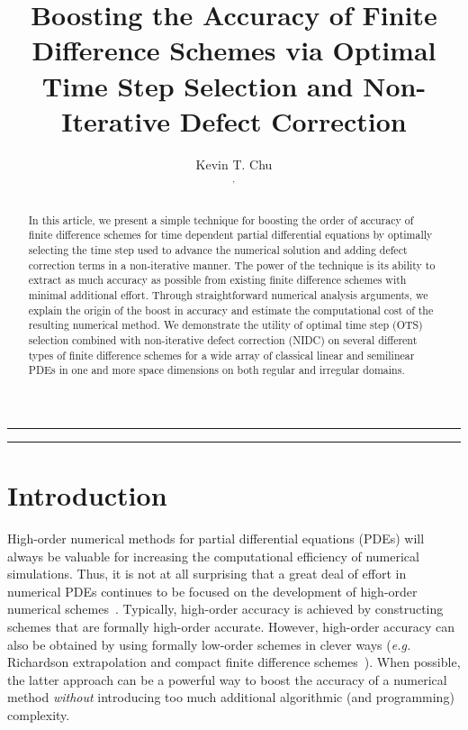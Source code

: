 \documentclass[fleqn,12pt,twoside]{article}
\def\eg{\emph{e.g. }}
\begin{document}


\title{Boosting the Accuracy of Finite Difference Schemes via
       Optimal Time Step Selection and Non-Iterative Defect Correction}

\author{Kevin T. Chu\address{Institute of High Performance Computing, A*STAR, Singapore, Singapore}$^,$\address{Vitamin D, Inc., Menlo Park, CA 94025, United States}
}


\maketitle

\noindent \rule{6.3in}{1pt}

\begin{abstract}
In this article, we present a simple technique for boosting the order of 
accuracy of finite difference schemes for time dependent 
partial differential equations by optimally selecting the time step used
to advance the numerical solution and adding defect correction terms in a
non-iterative manner.  The power of the technique is its ability to extract 
as much accuracy as possible from existing finite difference schemes with 
minimal additional effort.  Through straightforward numerical analysis 
arguments, we explain the origin of the boost in accuracy and estimate the 
computational cost of the resulting numerical method.  We demonstrate the 
utility of optimal time step (OTS) selection combined with non-iterative 
defect correction (NIDC) on several different types of finite difference
schemes for a wide array of classical linear and semilinear PDEs in one and 
more space dimensions on both regular and irregular domains.  
\end{abstract}

\noindent \rule{6.3in}{1pt}


\section{Introduction}
High-order numerical methods for partial differential equations (PDEs) will 
always be valuable for increasing the computational efficiency of numerical 
simulations.  Thus, it is not at all surprising that a great deal of effort in 
numerical PDEs continues to be focused on the development of high-order 
numerical 
schemes~\cite{spotz_2001,bruger_2005,gibou_2005,ito_2005,shukla_2005,heidenreich_2007,shukla_2007}.  
Typically, high-order accuracy is achieved by constructing
schemes that are formally high-order accurate.  However, high-order 
accuracy can also be obtained by using formally low-order schemes in clever 
ways (\eg Richardson extrapolation and compact finite difference 
schemes~\cite{spotz_2001}).  When possible, the latter approach can be a 
powerful way to boost the accuracy of a numerical method \emph{without} 
introducing too much additional algorithmic (and programming) complexity.
\end{document}
